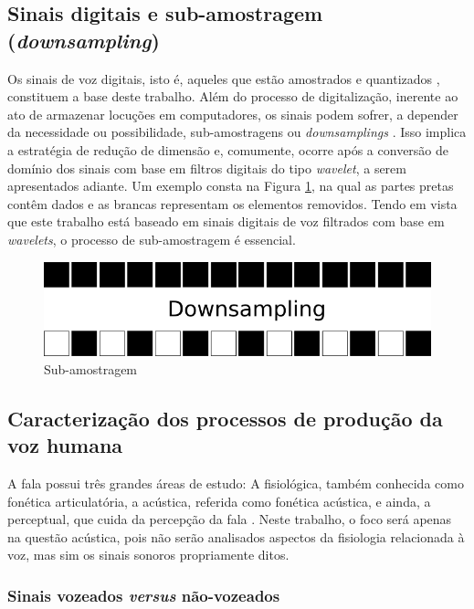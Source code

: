 		\subsection{Sinais digitais e sub-amostragem (\textit{downsampling})}
			\par Os sinais de voz digitais, isto é, aqueles que estão amostrados e quantizados \cite{haykin2011sistemas}, constituem a base deste trabalho. Além do processo de digitalização, inerente ao ato de armazenar locuções em computadores, os sinais podem sofrer, a depender da necessidade ou possibilidade, sub-amostragens ou \textit{downsamplings} \cite{robi2003}. Isso implica a estratégia de redução de dimensão e, comumente, ocorre após a conversão de domínio dos sinais com base em filtros digitais do tipo \textit{wavelet}, a serem apresentados adiante. Um exemplo consta na Figura \ref{fig:downsampling}, na qual as partes pretas contêm dados e as brancas representam os elementos removidos. Tendo em vista que este trabalho está baseado em sinais digitais de voz filtrados com base em \textit{wavelets}, o processo de sub-amostragem é essencial. 
			\begin{figure}[h]
				\centering
				\includegraphics[width=0.7\linewidth]{images/downsampling}
				\caption{Sub-amostragem}
				\label{fig:downsampling}
			\end{figure}
			
		\subsection{Caracterização dos processos de produção da voz humana}
			\par A fala possui três grandes áreas de estudo: A fisiológica, também conhecida como fonética articulatória, a acústica, referida como fonética acústica, e ainda, a perceptual, que cuida da percepção  da  fala \cite{kremer2014eficiencia}. Neste trabalho, o foco será apenas na questão acústica, pois não serão analisados aspectos da fisiologia relacionada à voz, mas sim os sinais sonoros propriamente ditos.
			
			\subsubsection{Sinais vozeados \textit{versus} não-vozeados}

